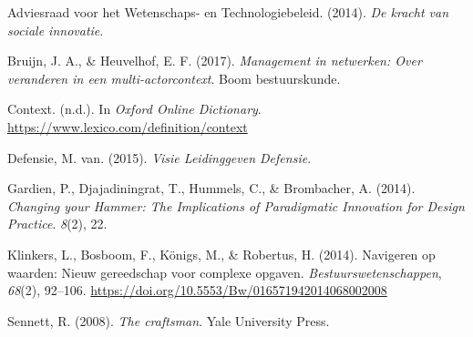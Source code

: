 \documentclass[
]{book}
\newlength{\cslhangindent}
\newenvironment{CSLReferences}[2] %
 {%
  \setlength{\parindent}{0pt}
  \ifodd #1 \everypar{\setlength{\hangindent}{\cslhangindent}}\ignorespaces\fi
  \ifnum #2 > 0
  \setlength{\parskip}{#2\baselineskip}
  \fi
 }%
 {}
\begin{document}
\hypertarget{refs}{}
\begin{CSLReferences}{1}{0}
\leavevmode{}%
Adviesraad voor het Wetenschaps- en Technologiebeleid. (2014). \emph{De kracht van sociale innovatie}.

\leavevmode{}%
Bruijn, J. A., \& Heuvelhof, E. F. (2017). \emph{Management in netwerken: Over veranderen in een multi-actorcontext}. Boom bestuurskunde.

\leavevmode{}%
Context. (n.d.). In \emph{Oxford Online Dictionary}. \url{https://www.lexico.com/definition/context}

\leavevmode{}%
Defensie, M. van. (2015). \emph{Visie {Leidinggeven} {Defensie}}.

\leavevmode{}%
Gardien, P., Djajadiningrat, T., Hummels, C., \& Brombacher, A. (2014). \emph{Changing your {Hammer}: {The} {Implications} of {Paradigmatic} {Innovation} for {Design} {Practice}}. \emph{8}(2), 22.

\leavevmode{}%
Klinkers, L., Bosboom, F., Königs, M., \& Robertus, H. (2014). Navigeren op waarden: Nieuw gereedschap voor complexe opgaven. \emph{Bestuurswetenschappen}, \emph{68}(2), 92--106. \url{https://doi.org/10.5553/Bw/016571942014068002008}

\leavevmode{}%
Sennett, R. (2008). \emph{The craftsman}. Yale University Press.

\end{CSLReferences}
\end{document}

